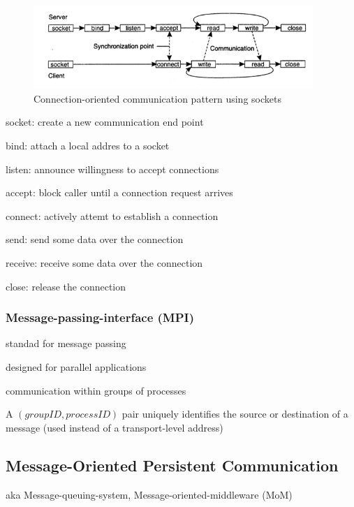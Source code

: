 \documentclass[ngerman,a4paper]{report}
\begin{document}
\begin{figure}[h]
	\centering
	\includegraphics[width=400px]{gfx/sockets.png}
	\caption{Connection-oriented communication pattern using sockets}
	\label{img:sockets}
\end{figure}

\begin{compactitem}
	\item socket: create a new communication end point
	\item bind: attach a local addres to a socket
	\item listen: announce willingness to accept connections
	\item accept: block caller until a connection request arrives
	\item connect: actively attemt to establish a connection
	\item send: send some data over the connection
	\item receive: receive some data over the connection
	\item close: release the connection
\end{compactitem}

\subsubsection{Message-passing-interface (MPI)}
\begin{compactitem}
	\item standad for message passing
	\item designed for parallel applications
	\item communication within groups of processes
	\item A $(groupID, processID)$ pair uniquely identifies the source or destination of a message (used instead of a transport-level address)
\end{compactitem}

\subsection{Message-Oriented Persistent Communication}

aka Message-queuing-system, Message-oriented-middleware (MoM) \\
\end{document}

